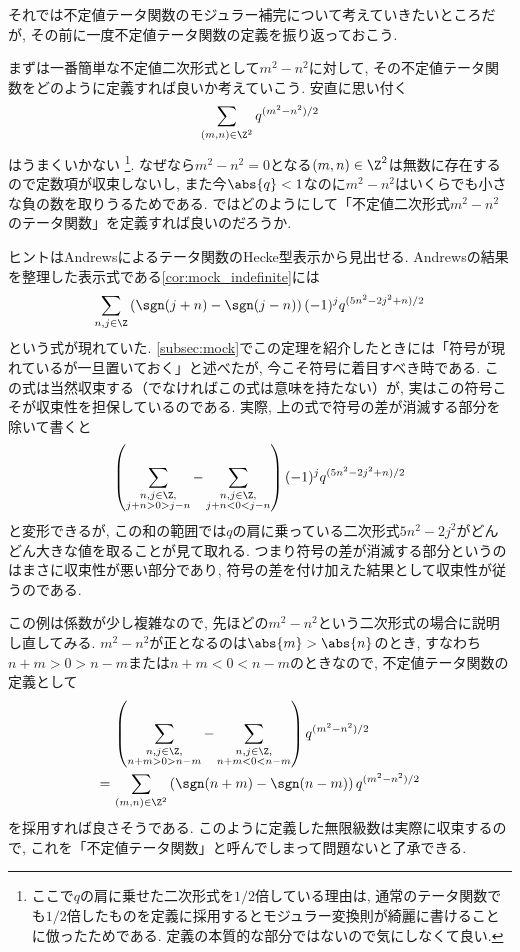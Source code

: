 \documentclass[11pt,b5paper,oneside,lualatex]{ltjsarticle} %
\numberwithin{equation}{section} %
\begin{document}

それでは不定値テータ関数のモジュラー補完について考えていきたいところだが, その前に一度不定値テータ関数の定義を振り返っておこう. 

まずは一番簡単な不定値二次形式として$ m^2 - n^2 $に対して, その不定値テータ関数をどのように定義すれば良いか考えていこう. 
安直に思い付く
\[
\sum_{(m, n) \in \Z^2} q^{(m^2 - n^2)/2}
\]
はうまくいかない%
\footnote{ここで$ q $の肩に乗せた二次形式を$ 1/2 $倍している理由は, 通常のテータ関数でも$ 1/2 $倍したものを定義に採用するとモジュラー変換則が綺麗に書けることに倣ったためである. 定義の本質的な部分ではないので気にしなくて良い. }. 
なぜなら$ m^2 - n^2 = 0 $となる$ (m, n) \in \Z^2 $は無数に存在するので定数項が収束しないし, また今$ \abs{q} < 1 $なのに$ m^2 - n^2 $はいくらでも小さな負の数を取りうるためである. 
ではどのようにして「不定値二次形式$ m^2 - n^2 $のテータ関数」を定義すれば良いのだろうか. 

ヒントはAndrewsによるテータ関数のHecke型表示から見出せる. 
Andrewsの結果を整理した表示式である\cref{cor:mock_indefinite}には
\[
\sum_{n, j \in \Z} \left( \sgn(j+n) - \sgn(j-n) \right) (-1)^j q^{(5n^2 - 2j^2 + n)/2}
\]
という式が現れていた. 
\cref{subsec:mock}でこの定理を紹介したときには「符号が現れているが一旦置いておく」と述べたが, 今こそ符号に着目すべき時である. 
この式は当然収束する（でなければこの式は意味を持たない）が, 実はこの符号こそが収束性を担保しているのである. 
実際, 上の式で符号の差が消滅する部分を除いて書くと
\[
\left( \sum_{\substack{n, j \in \Z, \\ j+n > 0 > j-n}} - \sum_{\substack{n, j \in \Z, \\ j+n < 0 < j-n}} \right) (-1)^j q^{(5n^2 - 2j^2 + n)/2}
\]
と変形できるが, この和の範囲では$ q $の肩に乗っている二次形式$ 5n^2 - 2j^2 $がどんどん大きな値を取ることが見て取れる. 
つまり符号の差が消滅する部分というのはまさに収束性が悪い部分であり, 符号の差を付け加えた結果として収束性が従うのである. 

この例は係数が少し複雑なので, 先ほどの$ m^2 - n^2 $という二次形式の場合に説明し直してみる. 
$ m^2 - n^2 $が正となるのは$ \abs{m} > \abs{n} $のとき, すなわち$ n+m > 0 > n-m $または$ n+m < 0 < n-m $のときなので, 不定値テータ関数の定義として
\begin{align}
	&\left( \sum_{\substack{n, j \in \Z, \\ n+m > 0 > n-m}} - \sum_{\substack{n, j \in \Z, \\ n+m < 0 < n-m}} \right) q^{(m^2 - n^2)/2}
	\\
	= \,
	&\sum_{(m, n) \in \Z^2} \left( \sgn(n+m) - \sgn(n-m) \right) q^{(m^2 - n^2)/2}
	\label{eq:indef_ex}
\end{align}
を採用すれば良さそうである. 
このように定義した無限級数は実際に収束するので, これを「不定値テータ関数」と呼んでしまって問題ないと了承できる. 
\end{document}
